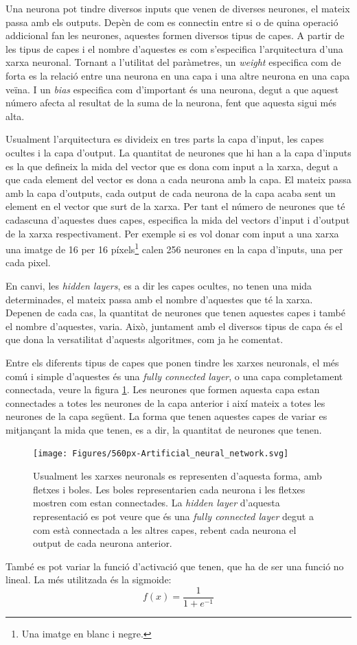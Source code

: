 Una neurona pot tindre diversos inputs que venen de diverses neurones, el mateix passa amb els outputs. Depèn de com es connectin entre si o de quina operació addicional fan les neurones, aquestes formen diversos tipus de capes. A partir de les tipus de capes i el nombre d'aquestes es com s'especifica l'arquitectura d'una xarxa neuronal. Tornant a l'utilitat del paràmetres, un \textit{weight} especifica com de forta es la relació entre una neurona en una capa i una altre neurona en una capa veïna. I un \textit{bias} especifica com d'important és una neurona, degut a que aquest número afecta al resultat de la suma de la neurona, fent que aquesta sigui més alta.

Usualment l'arquitectura es divideix en tres parts la capa d'input, les capes ocultes i la capa d'output. La quantitat de neurones que hi han a la capa d'inputs es la que defineix la mida del vector que es dona com input a la xarxa, degut a que cada element del vector es dona a cada neurona amb la capa. El mateix passa amb la capa d'outputs, cada output de cada neurona de la capa acaba sent un element en el vector que surt de la xarxa. Per tant el número de neurones que té cadascuna d'aquestes dues capes, especifica la mida del vectors d'input i d'output de la xarxa respectivament. Per exemple si es vol donar com input a una xarxa una imatge de 16 per 16 píxels\footnote{Una imatge en blanc i negre.} calen 256 neurones en la capa d'inputs, una per cada pixel. 

En canvi, les \textit{hidden layers}, es a dir les capes ocultes, no tenen una mida determinades, el mateix passa amb el nombre d'aquestes que té la xarxa. Depenen de cada cas, la quantitat de neurones que tenen aquestes capes i també el nombre d'aquestes, varia. Això, juntament amb el diversos tipus de capa és el que dona la versatilitat d'aquests algoritmes, com ja he comentat. 
 
Entre els diferents tipus de capes que ponen tindre les xarxes neuronals, el més comú i simple d'aquestes és una \textit{fully connected layer}, o una capa completament connectada, veure la figura \ref{fig:560px-artificialneuralnetwork}. Les neurones que formen aquesta capa estan connectades a totes les neurones de la capa anterior i així mateix a totes les neurones de la capa següent. La forma que tenen aquestes capes de variar es mitjançant la mida que tenen, es a dir, la quantitat de neurones que tenen. \begin{figure}
	\centering
	\texttt{[image: Figures/560px-Artificial\_neural\_network.svg]}
	\caption{Usualment les xarxes neuronals es representen d'aquesta forma, amb fletxes i boles. Les boles representarien cada neurona i les fletxes mostren com estan connectades. La \textit{hidden layer} d'aquesta representació es pot veure que és una \textit{fully connected layer} degut a com està connectada a les altres capes, rebent cada neurona el output de cada neurona anterior.}
	\label{fig:560px-artificialneuralnetwork}
\end{figure}
També es pot variar la funció d'activació que tenen, que ha de ser una funció no lineal. La més utilitzada és la sigmoide:
$$
f(x) = \frac{1}{1+e^{-1}}
$$

